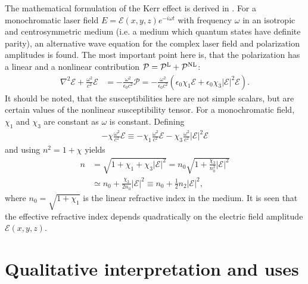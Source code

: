 The mathematical formulation of the Kerr effect is derived in
\textcite[sec.~10.3]{milonni}. For a monochromatic laser field $E =
\mathcal{E}(x,y,z) e^{-i \omega t}$ with frequency $\omega$ in an isotropic
and centrosymmetric medium (i.e. a medium which quantum states have
definite parity), an alternative wave equation for the complex laser
field and polarization amplitudes is found. The most important point
here is, that the polarization has a linear and a nonlinear
contribution $\mathcal{P} = \mathcal{P}^{\textup L} +
\mathcal{P}^{\textup{NL}}$:
\begin{align}
  \label{eq:kerr-wave-eqn}
  \nabla^2 \mathcal{E} + \frac{\omega^2}{c^2} \mathcal{E}
  &= - \frac{\omega^2}{\epsilon_0 c^2} \mathcal{P}
  = - \frac{\omega^2}{\epsilon_0 c^2} \left( \epsilon_0 \chi_1
    \mathcal{E} + \epsilon_0 \chi_3 |\mathcal{E}|^2 \mathcal{E}
  \right).
\end{align}
It should be noted, that the susceptibilities here are not simple
scalars, but are certain values of the nonlinear susceptibility
tensor. For a monochromatic field, $\chi_1$ and $\chi_3$ are constant
as $\omega$ is constant. Defining 
\begin{align}
  - \chi \frac{\omega^2}{c^2} \mathcal{E}
  \equiv - \chi_1 \frac{\omega^2}{c^2} \mathcal{E}
  - \chi_3 \frac{\omega^2}{c^2} |\mathcal{E}|^2 \mathcal{E}
\end{align}
and using $n^2 = 1 + \chi$ yields
\begin{align}
  n &= \sqrt{1 + \chi_1 + \chi_3 |\mathcal{E}|^2}
  = n_0 \sqrt{1 + \frac{\chi_3}{n_0^2} |\mathcal{E}|^2}
  \\
  &\simeq n_0 + \frac{\chi_3}{2n_0} |\mathcal{E}|^2
  \label{eq:kerr-n-chi}
  \equiv n_0 + \tfrac{1}{2} n_2 |\mathcal{E}|^2,
\end{align}
where $n_0 = \sqrt{1 + \chi_1}$ is the linear refractive index in the
medium.
It is seen that the effective refractive index
depends quadratically on the electric field amplitude $\mathcal{E}(x,y,z)$.


\section{Qualitative interpretation and uses}
\label{sec:kerr-interpr}

